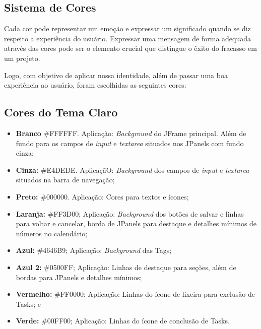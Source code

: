 \documentclass[a4paper,12pt]{article}
\begin{document}
\subsection{Sistema de Cores}
Cada cor pode representar um emoção e expressar um significado quando se diz respeito a experiência do usuário. Expressar uma 
mensagem de forma adequada através das cores pode ser o elemento crucial que distingue o êxito do fracasso em um projeto.

Logo, com objetivo de aplicar nossa identidade, além de passar uma boa experiência ao usuário, foram escolhidas as seguintes cores:

\subsection{Cores do Tema Claro}
\begin{itemize}
	\item \textbf{Branco} \#FFFFFF. Aplicação: \textit{Background} do JFrame principal. Além de fundo para os campos de \textit{input} e \textit{textarea} situados nos JPanels com fundo cinza;
	\item \textbf{Cinza:} \#E4DEDE. AplicaçãO: \textit{Background} dos campos de \textit{input} e \textit{textarea} situados na barra de navegação;
	\item \textbf{Preto:} \#000000. Aplicação: Cores para textos e ícones;
	\item \textbf{Laranja:} \#FF3D00; Aplicação: \textit{Background} dos botões de salvar e linhas para voltar e cancelar, borda de JPanels para destaque e detalhes mínimos de números no calendário;
	\item \textbf{Azul:} \#4646B9; Aplicação: \textit{Background} das Tags;
	\item \textbf{Azul 2:} \#0500FF; Aplicação: Linhas de destaque para seções, além de bordas para JPanels e detalhes mínimos;
	\item \textbf{Vermelho:} \#FF0000; Aplicação: Linhas do ícone de lixeira para exclusão de Tasks; e
	\item \textbf{Verde:} \#00FF00; Aplicação: Linhas do ícone de conclusão de Tasks.
\end{itemize}
\end{document}
